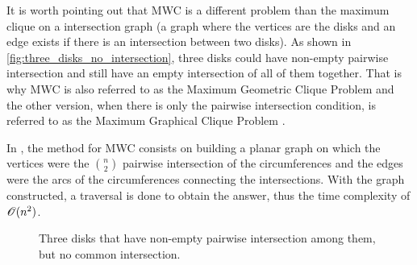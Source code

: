 It is worth pointing out that MWC is a different problem than the maximum clique on a intersection graph (a graph where the vertices are the disks and an edge exists if there is an intersection between two disks). 
As shown in \autoref{fig:three_disks_no_intersection}, three disks could have non-empty pairwise intersection and still have an empty intersection of all of them together.
That is why MWC is also referred to as the Maximum Geometric Clique Problem and the other version, when there is only the pairwise intersection condition, is referred to as the Maximum Graphical Clique Problem \cite{inplace:2014}. 


In , the method for MWC consists on building a planar graph on which the vertices were the $\binom{n}{2}$ pairwise intersection of the circumferences and the edges were the arcs of the circumferences connecting the intersections. With the graph constructed, a traversal is done to obtain the answer, thus the time complexity of $\mathscr{O}(n^2)$.

\begin{figure}[H]
\centering

    \caption{Three disks that have non-empty pairwise intersection among them, but no common intersection.}
    \label{fig:three_disks_no_intersection}
    \fautor
\end{figure}


